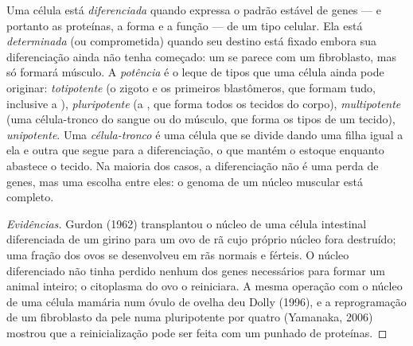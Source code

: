 \begin{definition}\label{def:b2:cell-differentiation:differentiation}
Uma célula está \emph{diferenciada} quando expressa o padrão estável
de genes --- e portanto as proteínas, a forma e a função --- de um tipo
celular. Ela está \emph{determinada} (ou comprometida) quando seu
destino está fixado embora sua diferenciação ainda não tenha começado:
um  se parece com um fibroblasto, mas só formará músculo. A
\emph{potência} é o leque de tipos que uma célula ainda pode originar:
\emph{totipotente} (o zigoto e os primeiros blastômeros, que formam
tudo, inclusive a ), \emph{pluripotente} (a , que forma todos os tecidos do corpo), \emph{multipotente}
(uma célula-tronco do sangue ou do músculo, que forma os tipos de um
tecido), \emph{unipotente}. Uma \emph{célula-tronco} é uma célula que
se divide dando uma filha igual a ela e outra que segue para a
diferenciação, o que mantém o estoque enquanto abastece o tecido. Na
maioria dos casos, a diferenciação não é uma perda de genes, mas uma
escolha entre eles: o genoma de um núcleo muscular está completo.
\end{definition}
\begin{proof}[Evidências]
Gurdon (1962) transplantou o núcleo de uma célula intestinal
diferenciada de um girino para um ovo de rã cujo próprio núcleo fora
destruído; uma fração dos ovos se desenvolveu em rãs normais e
férteis. O núcleo diferenciado não tinha perdido nenhum dos genes
necessários para formar um animal inteiro; o citoplasma do ovo o
reiniciara. A mesma operação com o núcleo de uma célula mamária num
óvulo de ovelha deu Dolly (1996), e a reprogramação de um fibroblasto
da pele numa  pluripotente por quatro  (Yamanaka, 2006) mostrou que a reinicialização pode ser
feita com um punhado de proteínas.
\end{proof}


